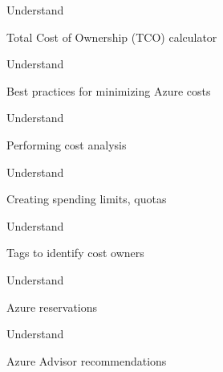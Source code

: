\documentclass{scrartcl}
\newenvironment{flashcard}[2][]{%
    #1
    \vfill
    \centerline{\Large{#2}}
    \vfill
    \newpage
}
{\newpage}
\begin{document}
    \begin{flashcard}[Understand]{Total Cost of Ownership (TCO) calculator}

    \end{flashcard}

    \begin{flashcard}[Understand]{Best practices for minimizing Azure costs}

    \end{flashcard}

    \begin{flashcard}[Understand]{Performing cost analysis}

    \end{flashcard}

    \begin{flashcard}[Understand]{Creating spending limits, quotas}

    \end{flashcard}

    \begin{flashcard}[Understand]{Tags to identify cost owners}

    \end{flashcard}

    \begin{flashcard}[Understand]{Azure reservations}

    \end{flashcard}

    \begin{flashcard}[Understand]{Azure Advisor recommendations}

    \end{flashcard}
\end{document}
